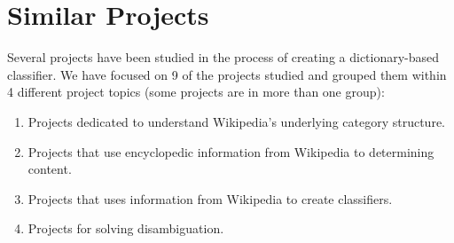 \begin{comment}
De ulike prosjektene: 

Projects with classifier creation: 

Projects determining content based on keyword extraction:
-Entity Extraction, Linking, Classification, and Tagging for Social Media: A Wikipedia-based Approach: entityextraction
-Large-Scale Taxonomy Mapping for Restructuring and Integrating Wikipedia: ponzetto2009large
-Automatic ontology extraction for document classification: kozlova2005automatic
-Overcoming the Brittleness Bottleneck using Wikipedia: Enhancing Text Categorization with Encyclopedic Knowledge: brittleness
-Wikify!: linking documents to encyclopedic knowledge: mihalcea2007wikify


Projects for determining content based on the category structure

Taking advantage of the category structure: 
-Extracting Semantic Relationships between Wikipedia Categories: chernov2006extracting
-Identyfing document topics using the Wikipedia category network: schonhofen2009identifying
-decoding wikipedia categories for knowledge adcquistion: nastase2008decoding

Disambiguation:
-named entity disambiguation by leveraging wikipedia semantic knowledge: han2009named
-large-scaled named entity disambiguation based on Wikipedia data: cucerzan2007large
-Distributed representations of words and phrases and their compositionality: mikolov2013distributed



\end{comment}

\section{Similar Projects}
\label{sec:similar_projects}
Several projects have been studied in the process of creating a dictionary-based classifier. We have focused on 9 of the projects studied and grouped them within 4 different project topics (some projects are in more than one group): 
\begin{enumerate}
\item Projects dedicated to understand  Wikipedia's underlying category structure.
\item Projects that use encyclopedic information from Wikipedia to determining content.
\item Projects that uses information from Wikipedia to create classifiers.
\item Projects for solving disambiguation. %
\end{enumerate}

